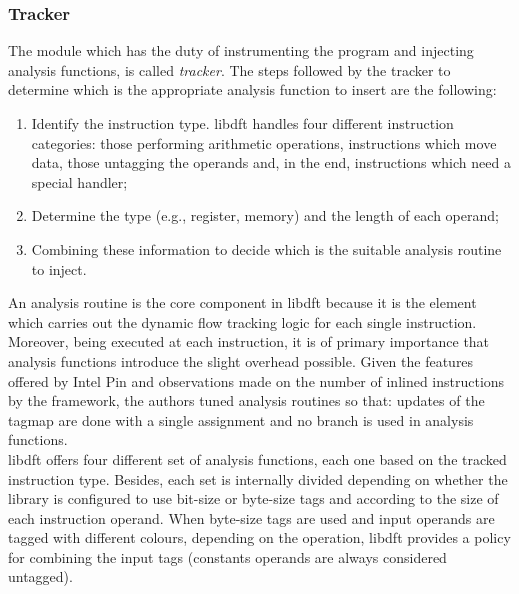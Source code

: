 \documentclass[LaM,binding=0.6cm]{sapthesis}
\begin{document}
\subsubsection{Tracker}
\label{subsubsec:taintpropagationlogic}
The module which has the duty of instrumenting the program and injecting analysis functions, is called \textit{tracker}. The steps followed by the tracker to determine which is the appropriate analysis function to insert are the following:
\begin{enumerate}
\item Identify the instruction type. libdft handles four different instruction categories: those performing arithmetic operations, instructions which move data, those untagging the operands and, in the end, instructions which need a special handler;
\item Determine the type (e.g., register, memory) and the length of each operand;
\item Combining these information to decide which is the suitable analysis routine to inject.
\end{enumerate}
An analysis routine is the core component in libdft because it is the element which carries out the dynamic flow tracking logic for each single instruction. Moreover, being executed at each instruction, it is of primary importance that analysis functions introduce the slight overhead possible. Given the features offered by Intel Pin and observations made on the number of inlined instructions by the framework, the authors tuned analysis routines so that: updates of the tagmap are done with a single assignment and no branch is used in analysis functions.\\

libdft offers four different set of analysis functions, each one based on the tracked instruction type. Besides, each set is internally divided depending on whether the library is configured to use bit-size or byte-size tags and according to the size of each instruction operand. When byte-size tags are used and input operands are tagged with different colours, depending on the operation, libdft provides a policy for combining the input tags (constants operands are always considered untagged).
\end{document}
